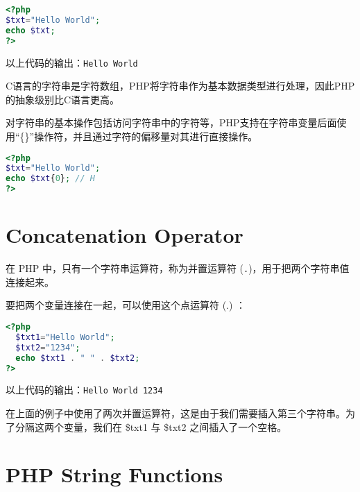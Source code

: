 \begin{lstlisting}[language=PHP]
<?php
$txt="Hello World";
echo $txt;
?>
\end{lstlisting}


以上代码的输出：\verb|Hello World|

C语言的字符串是字符数组，PHP将字符串作为基本数据类型进行处理，因此PHP的抽象级别比C语言更高。

对字符串的基本操作包括访问字符串中的字符等，PHP支持在字符串变量后面使用“\{\}”操作符，并且通过字符的偏移量对其进行直接操作。



\begin{lstlisting}[language=PHP]
<?php
$txt="Hello World";
echo $txt{0}; // H
?>
\end{lstlisting}


\section{Concatenation Operator}



在 PHP 中，只有一个字符串运算符，称为并置运算符 (\texttt{.})，用于把两个字符串值连接起来。

要把两个变量连接在一起，可以使用这个点运算符 (.) ：

\begin{lstlisting}[language=PHP]
<?php
  $txt1="Hello World";
  $txt2="1234";
  echo $txt1 . " " . $txt2;
?>
\end{lstlisting}


以上代码的输出：\verb|Hello World 1234|


在上面的例子中使用了两次并置运算符，这是由于我们需要插入第三个字符串。为了分隔这两个变量，我们在 \$txt1 与 \$txt2 之间插入了一个空格。








\section{PHP String Functions}



